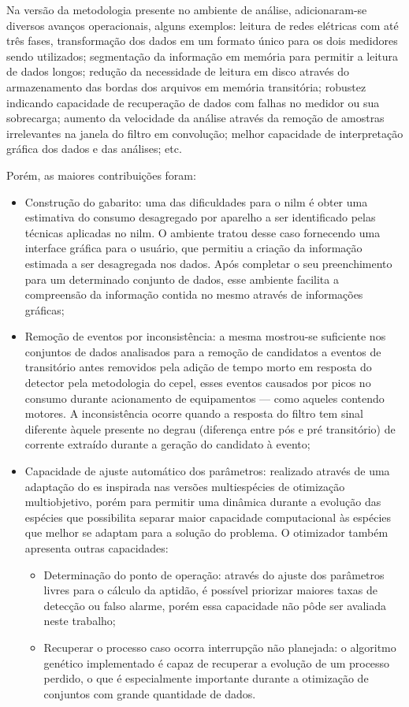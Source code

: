 Na versão da metodologia presente no ambiente de análise,
adicionaram-se diversos avanços operacionais, alguns exemplos: 
leitura de redes elétricas com até três fases, transformação dos dados
em um formato único para os dois medidores sendo utilizados;
segmentação da informação em memória para permitir a leitura de dados
longos; redução da necessidade de leitura em disco através do
armazenamento das bordas dos arquivos em memória transitória;
robustez indicando capacidade de recuperação de dados com falhas no
medidor ou sua sobrecarga; aumento da velocidade da análise através da
remoção de amostras irrelevantes na janela do filtro em convolução;
melhor capacidade de interpretação gráfica dos dados e das análises; etc.

Porém, as maiores contribuições foram: 

\begin{itemize}
\item Construção do gabarito: uma das dificuldades para o \acs{nilm} é
obter uma estimativa do consumo desagregado por aparelho a ser
identificado pelas técnicas aplicadas no \acs{nilm}. O ambiente tratou
desse caso fornecendo uma interface gráfica para o usuário, que
permitiu a criação da informação estimada a ser desagregada nos dados.
Após completar o seu preenchimento para um determinado conjunto de
dados, esse ambiente facilita a compreensão da informação contida no
mesmo através de informações gráficas;
\item Remoção de eventos por inconsistência: a mesma mostrou-se
suficiente nos conjuntos de dados analisados para a remoção de
candidatos a eventos de transitório antes removidos pela adição de
tempo morto em resposta do detector pela metodologia do \acs{cepel},
esses eventos causados por picos no consumo durante acionamento de
equipamentos --- como aqueles contendo motores. A inconsistência
ocorre quando a resposta do filtro tem sinal diferente àquele presente
no degrau (diferença entre pós e pré transitório) de corrente extraído
durante a geração do candidato à evento;
\item Capacidade de ajuste automático dos parâmetros: realizado
através de uma adaptação do \acl{es} inspirada nas versões
multiespécies de otimização multiobjetivo, porém para permitir uma
dinâmica durante a evolução das espécies que possibilita separar
maior capacidade computacional às espécies que melhor se adaptam para
a solução do problema. O otimizador também apresenta outras capacidades:
\begin{itemize}
\item Determinação do ponto de operação: através do ajuste dos
parâmetros livres para o cálculo da aptidão, é possível priorizar
maiores taxas de detecção ou falso alarme, porém essa capacidade não
pôde ser avaliada neste trabalho; 
\item Recuperar o processo caso ocorra interrupção não planejada: o
algoritmo genético implementado é capaz de recuperar a evolução de um
processo perdido, o que é especialmente importante durante a
otimização de conjuntos com grande quantidade de dados.
\end{itemize}
\end{itemize}

